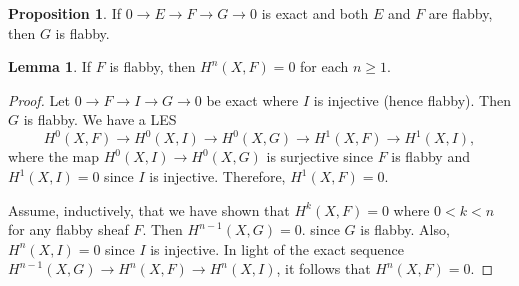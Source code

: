 \documentclass[10pt,letterpaper,cm]{nupset}
\theoremstyle{definition}
\theoremstyle{theorem}
\newtheorem{lemma}[definition]{Lemma}
\newtheorem{prop}[definition]{Proposition}
\theoremstyle{remark}
\newcommand{\1}{\mathbb{1}}
\newcommand{\0}{\vec 0}
\begin{document}
\begin{prop}
If $0 \to E \to F \to G \to 0$ is exact and both $E$ and $F$ are flabby, then $G$ is flabby.
\end{prop}

\begin{lemma}
If $F$ is flabby, then $H^n(X, F) =0$ for each $n\geq 1$.
\end{lemma}
\begin{proof}
 Let $0 \to F \to I \to G \to 0$ be exact where $I$ is injective (hence flabby). Then $G$ is flabby. We have a LES $$ H^0(X, F) \to H^0(X, I) \to H^0(X, G) \to H^1(X, F) \to H^1(X, I)  , $$ where the map $H^0(X, I) \to H^0(X, G)$ is surjective since $F$ is flabby and  $H^1(X, I) =0$ since $I$ is injective. Therefore, $H^1(X, F) =0$.
 
\medskip

 Assume, inductively, that we have shown that $H^k(X, F) =0$ where $0 < k <n$ for any flabby sheaf $F$. Then $H^{n-1}(X, G) =0$. since $G$ is flabby. Also, $H^n(X, I) =0$ since $I$ is injective. In light of the exact sequence $H^{n-1}(X, G) \to H^n(X, F) \to H^n(X, I)$, it follows that $H^n(X, F) =0$.
\end{proof}
\end{document}
